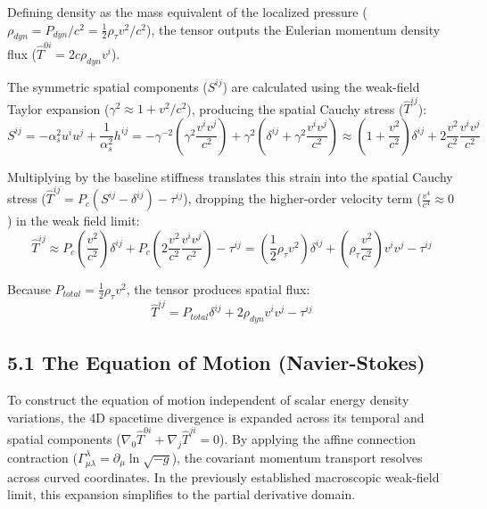 Defining density as the mass equivalent of the localized pressure ($\rho_{dyn} = P_{dyn}/c^2 = \frac{1}{2}\rho_\tau v^2/c^2$), the tensor outputs the Eulerian momentum density flux ($\hat{T}^{0i} = 2 c \rho_{dyn} v^i$). 

The symmetric spatial components ($S^{ij}$) are calculated using the weak-field Taylor expansion ($\gamma^2 \approx 1 + v^2/c^2$), producing the spatial Cauchy stress ($\hat{T}^{ij}$): 
\begin{equation}
    S^{ij} = -\alpha_s^2 u^i u^j + \frac{1}{\alpha_s^2} h^{ij} = -\gamma^{-2}\left(\gamma^2 \frac{v^i v^j}{c^2}\right) + \gamma^2\left(\delta^{ij} + \gamma^2 \frac{v^i v^j}{c^2}\right) \approx \left(1 + \frac{v^2}{c^2}\right)\delta^{ij} + 2\frac{v^2}{c^2}\frac{v^i v^j}{c^2} 
\end{equation}

Multiplying by the baseline stiffness translates this strain into the spatial Cauchy stress ($\hat{T}^{ij} = P_c(S^{ij} - \delta^{ij}) - \tau^{ij}$), dropping the higher-order velocity term ($\frac{v^4}{c^4} \approx 0$) in the weak field limit: 
\begin{equation}
    \hat{T}^{ij} \approx P_c\left(\frac{v^2}{c^2}\right)\delta^{ij} + P_c\left(2\frac{v^2}{c^2}\frac{v^i v^j}{c^2}\right) - \tau^{ij} = \left(\frac{1}{2}\rho_\tau v^2\right)\delta^{ij} + \left(\rho_\tau \frac{v^2}{c^2}\right)v^i v^j - \tau^{ij} 
\end{equation}

Because $P_{total} = \frac{1}{2}\rho_\tau v^2$, the tensor produces spatial flux: 
\begin{equation}
    \hat{T}^{ij} = P_{total}\delta^{ij} + 2 \rho_{dyn} v^i v^j - \tau^{ij} 
\end{equation}

\subsection*{5.1 The Equation of Motion (Navier-Stokes)} 

To construct the equation of motion independent of scalar energy density variations, the 4D spacetime divergence is expanded across its temporal and spatial components ($\nabla_0 \hat{T}^{0i} + \nabla_j \hat{T}^{ji} = 0$). By applying the affine connection contraction ($\Gamma^\lambda_{\mu\lambda} = \partial_\mu \ln\sqrt{-g}$), the covariant momentum transport resolves across curved coordinates. In the previously established macroscopic weak-field limit, this expansion simplifies to the partial derivative domain. 

